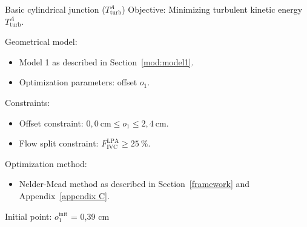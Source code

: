 \begin{optimproblem}{Basic cylindrical junction ($T^{A}_{\mathrm{turb}}$)}
	\vspace{2mm}
	Objective: Minimizing turbulent kinetic energy $T^{A}_{\mathrm{turb}}$.
	
	\vspace{2mm}
	Geometrical model:
	\begin{itemize}
		\item Model 1 as described in Section~\ref{mod:model1}.
		\item Optimization parameters: offset $o_1$.
	\end{itemize}
	Constraints:
	\begin{itemize}
		\item Offset constraint: $0{,}0~\text{cm} \leq o_1 \leq 2{,}4~\text{cm}$.
		\item Flow split constraint: $F^{\text{LPA}}_{\text{IVC}} \geq 25~\%$.
	\end{itemize}
	Optimization method:
	\begin{itemize}
		\item Nelder-Mead method as described in Section~\ref{framework} and Appendix~\ref{appendix C}.
	\end{itemize}
	Initial point: $o^{\text{init}}_{1}$ = 0{,}39 cm
	\label{optimprob:2}
\end{optimproblem}


